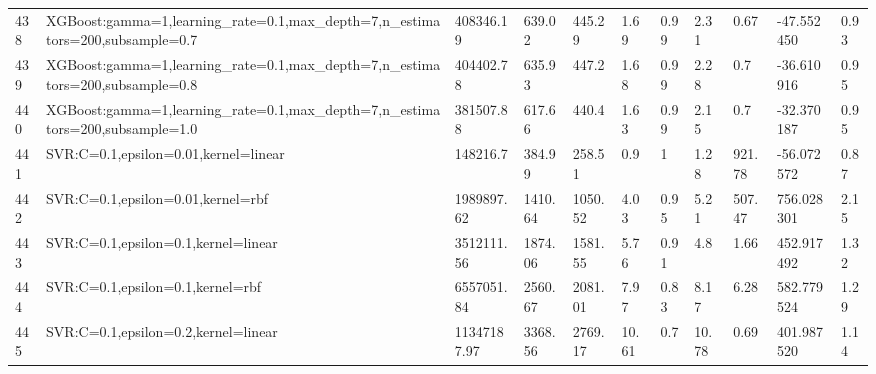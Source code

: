 \begin{longtable}{C{0.8cm} L{2cm} C{1.15cm} C{1.15cm} C{1.15cm} C{1.15cm} C{0.85cm} C{1.25cm} C{1.2cm} C{1.5cm} C{1.0cm}}
438 & XGBoost:\newline gamma=1,\newline learning\_rate=0.1,\newline max\_depth=7,\newline n\_estimators=200,\newline subsample=0.7 & 408346.19 & 639.02 & 445.29 & 1.69 & 0.99 & 2.31 & 0.67 & -47.552450 & 0.93 \\
439 & XGBoost:\newline gamma=1,\newline learning\_rate=0.1,\newline max\_depth=7,\newline n\_estimators=200,\newline subsample=0.8 & 404402.78 & 635.93 & 447.2 & 1.68 & 0.99 & 2.28 & 0.7 & -36.610916 & 0.95 \\
440 & XGBoost:\newline gamma=1,\newline learning\_rate=0.1,\newline max\_depth=7,\newline n\_estimators=200,\newline subsample=1.0 & 381507.88 & 617.66 & 440.4 & 1.63 & 0.99 & 2.15 & 0.7 & -32.370187 & 0.95 \\
441 & SVR:\newline C=0.1,\newline epsilon=0.01,\newline kernel=linear & 148216.7 & 384.99 & 258.51 & 0.9 & 1 & 1.28 & 921.78 & -56.072572 & 0.87 \\
442 & SVR:\newline C=0.1,\newline epsilon=0.01,\newline kernel=rbf & 1989897.62 & 1410.64 & 1050.52 & 4.03 & 0.95 & 5.21 & 507.47 & 756.028301 & 2.15 \\
443 & SVR:\newline C=0.1,\newline epsilon=0.1,\newline kernel=linear & 3512111.56 & 1874.06 & 1581.55 & 5.76 & 0.91 & 4.8 & 1.66 & 452.917492 & 1.32 \\
444 & SVR:\newline C=0.1,\newline epsilon=0.1,\newline kernel=rbf & 6557051.84 & 2560.67 & 2081.01 & 7.97 & 0.83 & 8.17 & 6.28 & 582.779524 & 1.29 \\
445 & SVR:\newline C=0.1,\newline epsilon=0.2,\newline kernel=linear & 11347187.97 & 3368.56 & 2769.17 & 10.61 & 0.7 & 10.78 & 0.69 & 401.987520 & 1.14 \\

\end{longtable}
